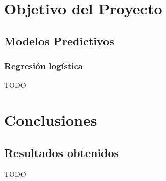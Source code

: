 \documentclass[10pt,a4paper]{book}
\begin{document}
\part{Objetivo del Proyecto}

\chapter{Modelos Predictivos}

\section{Regresión logística}
TODO

\part{Conclusiones}

\chapter{Resultados obtenidos}
TODO
\end{document}
